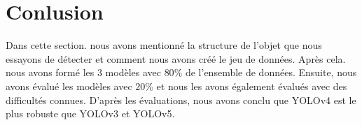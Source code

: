 \section{Conlusion}
Dans cette section. nous avons mentionné la structure de l'objet que nous essayons de détecter et comment nous avons créé le jeu de données. Après cela. nous avons formé les 3 modèles avec $80\%$ de l'ensemble de données. Ensuite, nous avons évalué les modèles avec $20\%$ et nous les avons également évalués avec des difficultés connues.
D'après les évaluations, nous avons conclu que YOLOv4 est le plus robuste que YOLOv3 et YOLOv5.
